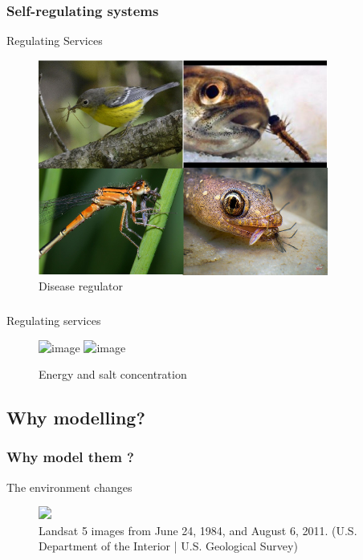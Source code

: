 \documentclass{beamer}
\begin{document}
	\begin{frame}
		\frametitle{Self-regulating systems}
		\begin{block}{Regulating Services}
				\begin{figure}				
				\centering
		    	\includegraphics[height=0.7\textheight,width=\textwidth]{em.png}		    	    
				\caption{Disease regulator }
		    	\end{figure}
		\end{block}
	\end{frame}

	\begin{frame}
		\frametitle{}
		\begin{block}{Regulating services}
				\begin{figure}				
				\centering
		    	\includegraphics<1>[height=0.7\textheight,width=\textwidth]{reg2.jpg}
		    	\includegraphics<2>[height=0.7\textheight,width=\textwidth]{reg1.jpeg}		    	    
				\caption{Energy and salt concentration }
		    	\end{figure}
		\end{block}
	\end{frame}


\subsection{Why modelling?}
	\begin{frame}
		\frametitle{Why model them ?}
		\begin{block}{The environment changes}
				\begin{figure}				
				\centering
		    	\includegraphics<1>[height=0.6\textheight,width=\textwidth]{deforest1.png}	    	    
				\caption{ Landsat 5 images from June 24, 1984, and August 6, 2011. (U.S. Department of the Interior | U.S. Geological Survey)  }
		    	\end{figure}
		\end{block}
	\end{frame}
\end{document}

